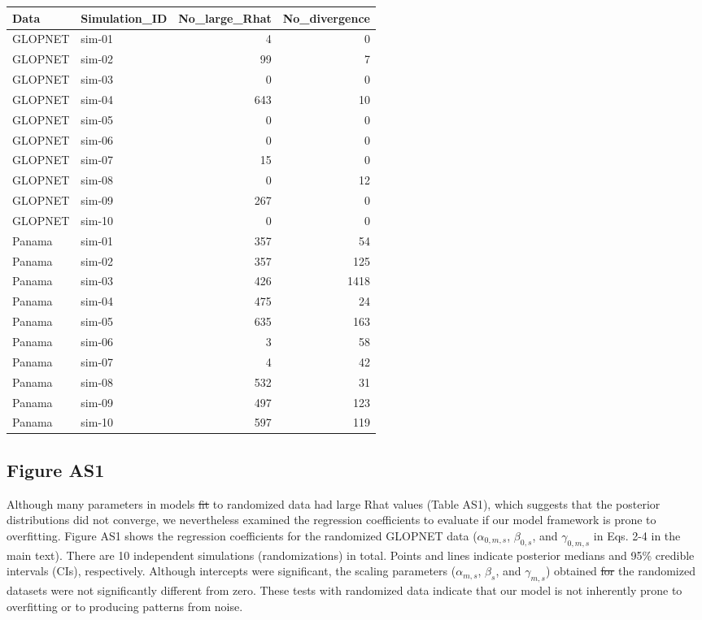 \documentclass[
  12pt,
  letterpaper,
  DIV=11,
  numbers=noendperiod]{scrartcl}
\numberwithin{equation}{section} %
\providecommand{\DIFadd}[1]{{\protect\color{blue}\uwave{#1}}} %
\providecommand{\DIFdel}[1]{{\protect\color{red}\sout{#1}}}                      %
\providecommand{\DIFaddbegin}{} %
\providecommand{\DIFaddend}{} %
\providecommand{\DIFdelbegin}{} %
\providecommand{\DIFdelend}{} %
\newcommand{\DIFscaledelfig}{0.5}
\newlength{\DIFdelgraphicswidth} %
\newlength{\DIFdelgraphicsheight} %
\newcommand{\DIFaddincludegraphics}[2][]{{\color{blue}\fbox{\DIFOincludegraphics[#1]{#2}}}} %
\newcommand{\DIFdelincludegraphics}[2][]{%
\sbox{\DIFdelgraphicsbox}{\DIFOincludegraphics[#1]{#2}}%
\settoboxwidth{\DIFdelgraphicswidth}{\DIFdelgraphicsbox} %
\settoboxtotalheight{\DIFdelgraphicsheight}{\DIFdelgraphicsbox} %
\scalebox{\DIFscaledelfig}{%
\parbox[b]{\DIFdelgraphicswidth}{\usebox{\DIFdelgraphicsbox}\\[-\baselineskip] \rule{\DIFdelgraphicswidth}{0em}}\llap{\resizebox{\DIFdelgraphicswidth}{\DIFdelgraphicsheight}{%
\setlength{\unitlength}{\DIFdelgraphicswidth}%
\begin{picture}(1,1)%
\thicklines\linethickness{2pt} %
{\color[rgb]{1,0,0}\put(0,0){\framebox(1,1){}}}%
{\color[rgb]{1,0,0}\put(0,0){\line( 1,1){1}}}%
{\color[rgb]{1,0,0}\put(0,1){\line(1,-1){1}}}%
\end{picture}%
}\hspace*{3pt}}} %
} %
\DeclareRobustCommand{\DIFaddbegin}{\DIFOaddbegin \let\includegraphics\DIFaddincludegraphics} %
\DeclareRobustCommand{\DIFaddend}{\DIFOaddend \let\includegraphics\DIFOincludegraphics} %
\DeclareRobustCommand{\DIFdelbegin}{\DIFOdelbegin \let\includegraphics\DIFdelincludegraphics} %
\DeclareRobustCommand{\DIFdelend}{\DIFOaddend \let\includegraphics\DIFOincludegraphics} %
\begin{document}
\begin{longtable*}[t]{llrr}
\toprule
Data & Simulation\_ID & No\_large\_Rhat & No\_divergence\\
\midrule
GLOPNET & sim-01 & 4 & 0\\
GLOPNET & sim-02 & 99 & 7\\
GLOPNET & sim-03 & 0 & 0\\
GLOPNET & sim-04 & 643 & 10\\
GLOPNET & sim-05 & 0 & 0\\
\addlinespace
GLOPNET & sim-06 & 0 & 0\\
GLOPNET & sim-07 & 15 & 0\\
GLOPNET & sim-08 & 0 & 12\\
GLOPNET & sim-09 & 267 & 0\\
GLOPNET & sim-10 & 0 & 0\\
\addlinespace
Panama & sim-01 & 357 & 54\\
Panama & sim-02 & 357 & 125\\
Panama & sim-03 & 426 & 1418\\
Panama & sim-04 & 475 & 24\\
Panama & sim-05 & 635 & 163\\
\addlinespace
Panama & sim-06 & 3 & 58\\
Panama & sim-07 & 4 & 42\\
Panama & sim-08 & 532 & 31\\
Panama & sim-09 & 497 & 123\\
Panama & sim-10 & 597 & 119\\
\bottomrule
\end{longtable*}

\newpage

\subsection{Figure AS1}\label{figure-as1}

Although many parameters in models \DIFdelbegin \DIFdel{fit }\DIFdelend \DIFaddbegin \DIFadd{fitted }\DIFaddend to randomized data had large
Rhat values (Table AS1), which suggests that the posterior distributions
did not converge, we nevertheless examined the regression coefficients
to evaluate if our model framework is prone to overfitting. Figure AS1
shows the regression coefficients for the randomized GLOPNET data
(\(\alpha_{0, m, s}\), \(\beta_{0, s}\), and \(\gamma_{0, m, s}\) \DIFaddbegin \DIFadd{as }\DIFaddend in
Eqs. 2-4 in the main text). There are 10 independent simulations
(randomizations) in total. Points and lines indicate posterior medians
and 95\% credible intervals (CIs), respectively. Although intercepts
were significant, the scaling parameters (\(\alpha_{m, s}\),
\(\beta_{s}\), and \(\gamma_{m, s}\)) obtained \DIFdelbegin \DIFdel{for }\DIFdelend \DIFaddbegin \DIFadd{from }\DIFaddend the randomized
datasets were not significantly different from zero. These tests with
randomized data indicate that our model is not inherently prone to
overfitting or to producing patterns from noise.
\end{document}
